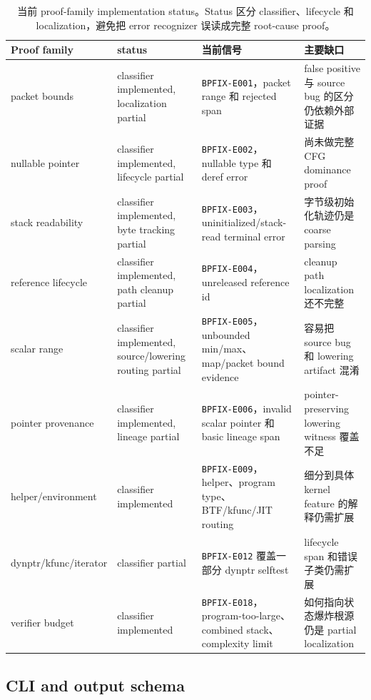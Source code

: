 \documentclass[letterpaper,twocolumn,10pt]{article}
\newcommand{\code}[1]{\texttt{#1}}
\begin{document}
\begin{table}[t]
\centering
\small
\caption{当前 proof-family implementation status。Status 区分 classifier、lifecycle 和 localization，避免把 error recognizer 误读成完整 root-cause proof。}
\label{tab:impl-status}
\begin{tabularx}{\textwidth}{@{}l l X X@{}}
\toprule
Proof family & status & 当前信号 & 主要缺口 \\
\midrule
packet bounds & classifier implemented, localization partial & \code{BPFIX-E001}，packet range 和 rejected span & false positive 与 source bug 的区分仍依赖外部证据 \\
nullable pointer & classifier implemented, lifecycle partial & \code{BPFIX-E002}，nullable type 和 deref error & 尚未做完整 CFG dominance proof \\
stack readability & classifier implemented, byte tracking partial & \code{BPFIX-E003}，uninitialized/stack-read terminal error & 字节级初始化轨迹仍是 coarse parsing \\
reference lifecycle & classifier implemented, path cleanup partial & \code{BPFIX-E004}，unreleased reference id & cleanup path localization 还不完整 \\
scalar range & classifier implemented, source/lowering routing partial & \code{BPFIX-E005}，unbounded min/max、map/packet bound evidence & 容易把 source bug 和 lowering artifact 混淆 \\
pointer provenance & classifier implemented, lineage partial & \code{BPFIX-E006}，invalid scalar pointer 和 basic lineage span & pointer-preserving lowering witness 覆盖不足 \\
helper/environment & classifier implemented & \code{BPFIX-E009}，helper、program type、BTF/kfunc/JIT routing & 细分到具体 kernel feature 的解释仍需扩展 \\
dynptr/kfunc/iterator & classifier partial & \code{BPFIX-E012} 覆盖一部分 dynptr selftest & lifecycle span 和错误子类仍需扩展 \\
verifier budget & classifier implemented & \code{BPFIX-E018}，program-too-large、combined stack、complexity limit & 如何指向状态爆炸根源仍是 partial localization \\
\bottomrule
\end{tabularx}
\end{table}

\subsection{CLI and output schema}
\end{document}
